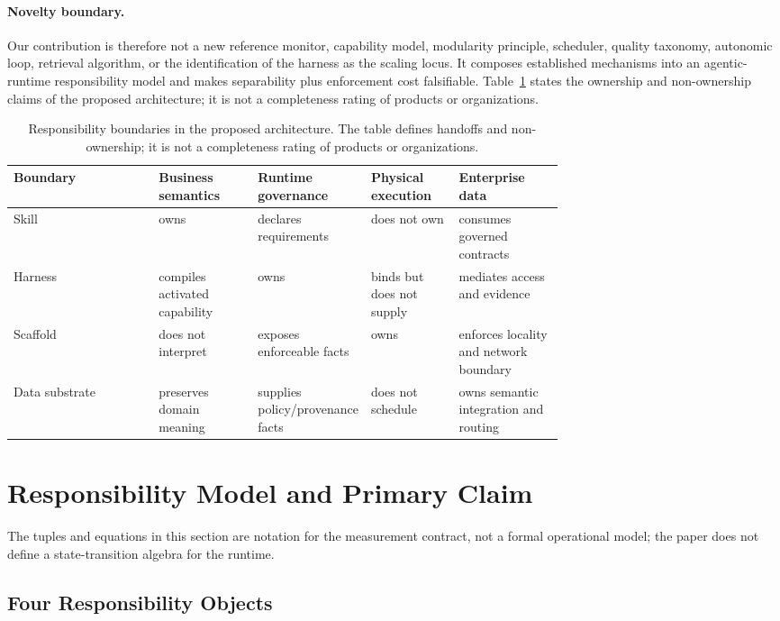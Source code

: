 \documentclass[11pt]{article}
\begin{document}
\paragraph{Novelty boundary.}
Our contribution is therefore not a new reference monitor, capability model, modularity principle, scheduler, quality taxonomy, autonomic loop, retrieval algorithm, or the identification of the harness as the scaling locus. It composes established mechanisms into an agentic-runtime responsibility model and makes separability plus enforcement cost falsifiable. Table~\ref{tab:responsibility-boundary} states the ownership and non-ownership claims of the proposed architecture; it is not a completeness rating of products or organizations.

\begin{table}[H]
\centering
\small
\caption{Responsibility boundaries in the proposed architecture. The table defines handoffs and non-ownership; it is not a completeness rating of products or organizations.}
\label{tab:responsibility-boundary}
\begin{tabular}{lp{0.18\linewidth}p{0.18\linewidth}p{0.16\linewidth}p{0.19\linewidth}}
\hline
Boundary & Business semantics & Runtime governance & Physical execution & Enterprise data \\
\hline
Skill & owns & declares requirements & does not own & consumes governed contracts \\
Harness & compiles activated capability & owns & binds but does not supply & mediates access and evidence \\
Scaffold & does not interpret & exposes enforceable facts & owns & enforces locality and network boundary \\
Data substrate & preserves domain meaning & supplies policy/provenance facts & does not schedule & owns semantic integration and routing \\
\hline
\end{tabular}
\end{table}

\section{Responsibility Model and Primary Claim}
\label{sec:model}

The tuples and equations in this section are notation for the measurement contract, not a formal operational model; the paper does not define a state-transition algebra for the runtime.

\subsection{Four Responsibility Objects}
\label{sec:runtime-objects}
\end{document}
